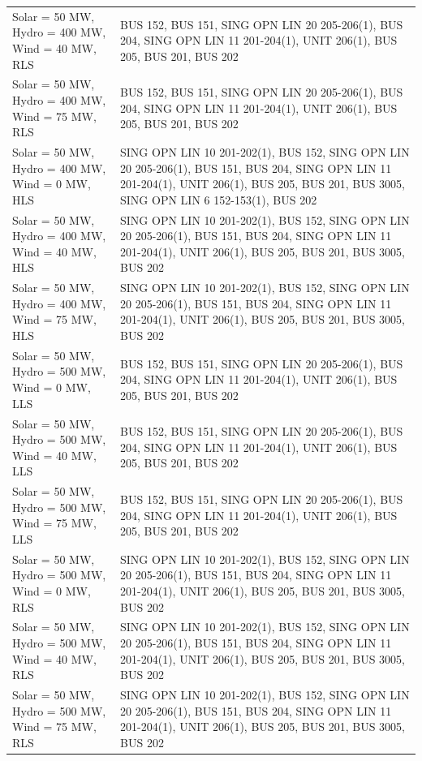 \documentclass[10pt]{report}
\begin{document}
\begin{table}[H]
{\begin{tabular}{lp{17cm}}
Solar = 50 MW, Hydro = 400 MW, Wind = 40 MW, RLS & BUS 152, BUS 151, SING OPN LIN   20 205-206(1), BUS 204, SING OPN LIN   11 201-204(1), UNIT 206(1), BUS 205, BUS 201, BUS 202 \\
Solar = 50 MW, Hydro = 400 MW, Wind = 75 MW, RLS & BUS 152, BUS 151, SING OPN LIN   20 205-206(1), BUS 204, SING OPN LIN   11 201-204(1), UNIT 206(1), BUS 205, BUS 201, BUS 202 \\
Solar = 50 MW, Hydro = 400 MW, Wind = 0 MW, HLS & SING OPN LIN   10 201-202(1), BUS 152, SING OPN LIN   20 205-206(1), BUS 151, BUS 204, SING OPN LIN   11 201-204(1), UNIT 206(1), BUS 205, BUS 201, BUS 3005, SING OPN LIN   6 152-153(1), BUS 202 \\
Solar = 50 MW, Hydro = 400 MW, Wind = 40 MW, HLS & SING OPN LIN   10 201-202(1), BUS 152, SING OPN LIN   20 205-206(1), BUS 151, BUS 204, SING OPN LIN   11 201-204(1), UNIT 206(1), BUS 205, BUS 201, BUS 3005, BUS 202 \\
Solar = 50 MW, Hydro = 400 MW, Wind = 75 MW, HLS & SING OPN LIN   10 201-202(1), BUS 152, SING OPN LIN   20 205-206(1), BUS 151, BUS 204, SING OPN LIN   11 201-204(1), UNIT 206(1), BUS 205, BUS 201, BUS 3005, BUS 202 \\
Solar = 50 MW, Hydro = 500 MW, Wind = 0 MW, LLS & BUS 152, BUS 151, SING OPN LIN   20 205-206(1), BUS 204, SING OPN LIN   11 201-204(1), UNIT 206(1), BUS 205, BUS 201, BUS 202 \\
Solar = 50 MW, Hydro = 500 MW, Wind = 40 MW, LLS & BUS 152, BUS 151, SING OPN LIN   20 205-206(1), BUS 204, SING OPN LIN   11 201-204(1), UNIT 206(1), BUS 205, BUS 201, BUS 202 \\
Solar = 50 MW, Hydro = 500 MW, Wind = 75 MW, LLS & BUS 152, BUS 151, SING OPN LIN   20 205-206(1), BUS 204, SING OPN LIN   11 201-204(1), UNIT 206(1), BUS 205, BUS 201, BUS 202 \\
Solar = 50 MW, Hydro = 500 MW, Wind = 0 MW, RLS & SING OPN LIN   10 201-202(1), BUS 152, SING OPN LIN   20 205-206(1), BUS 151, BUS 204, SING OPN LIN   11 201-204(1), UNIT 206(1), BUS 205, BUS 201, BUS 3005, BUS 202 \\
Solar = 50 MW, Hydro = 500 MW, Wind = 40 MW, RLS & SING OPN LIN   10 201-202(1), BUS 152, SING OPN LIN   20 205-206(1), BUS 151, BUS 204, SING OPN LIN   11 201-204(1), UNIT 206(1), BUS 205, BUS 201, BUS 3005, BUS 202 \\
Solar = 50 MW, Hydro = 500 MW, Wind = 75 MW, RLS & SING OPN LIN   10 201-202(1), BUS 152, SING OPN LIN   20 205-206(1), BUS 151, BUS 204, SING OPN LIN   11 201-204(1), UNIT 206(1), BUS 205, BUS 201, BUS 3005, BUS 202 \\

\end{tabular}}
\end{table}
\end{document}
